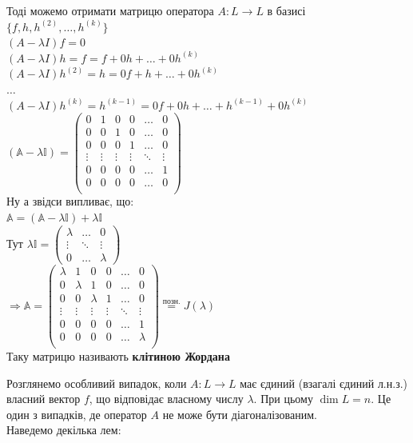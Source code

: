 Тоді можемо отримати матрицю оператора $A: L \to L$ в базисі $\{f,h,h^{(2)},\dots,h^{(k)}\}$\\
$(A-\lambda I)f = 0$\\
$(A-\lambda I)h = f = f + 0h + \dots + 0h^{(k)}$\\
$(A-\lambda I)h^{(2)} = h = 0f + h + \dots + 0h^{(k)}$\\
$\dots$\\
$(A-\lambda I)h^{(k)} = h^{(k-1)} = 0f + 0h + \dots + h^{(k-1)} + 0h^{(k)}$\\
$(\mathbb{A}- \lambda \mathbb{I}) = \begin{pmatrix}
0 & 1 & 0 & 0 & \dots & 0 \\
0 & 0 & 1 & 0 & \dots & 0 \\
0 & 0 & 0 & 1 & \dots & 0 \\
\vdots & \vdots & \vdots & \vdots & \ddots & \vdots \\
0 & 0 & 0 & 0 & \dots & 1 \\
0 & 0 & 0 & 0 & \dots & 0 \\
\end{pmatrix}$\\
Ну а звідси випливає, що:\\
$\mathbb{A} = (\mathbb{A} - \lambda \mathbb{I}) + \lambda \mathbb{I}$\\
Тут $\lambda \mathbb{I} = \begin{pmatrix}
\lambda & \dots & 0\\
\vdots & \ddots & \vdots\\
0 & \dots & \lambda
\end{pmatrix}$\\
$\Rightarrow \mathbb{A} = \begin{pmatrix}
\lambda & 1 & 0 & 0 & \dots & 0 \\
0 & \lambda & 1 & 0 & \dots & 0 \\
0 & 0 & \lambda & 1 & \dots & 0 \\
\vdots & \vdots & \vdots & \vdots & \ddots & \vdots \\
0 & 0 & 0 & 0 & \dots & 1 \\
0 & 0 & 0 & 0 & \dots & \lambda \\
\end{pmatrix} \overset{\textrm{позн.}}{=} J(\lambda)$\\
Таку матрицю називають \textbf{клітиною Жордана}
\fi

Розглянемо особливий випадок, коли $A: L \to L$ має єдиний (взагалі єдиний л.н.з.) власний вектор $f$, що відповідає власному числу $\lambda$. При цьому $\dim L = n$. Це один з випадків, де оператор $A$ не може бути діагоналізованим.\\
Наведемо декілька лем:

